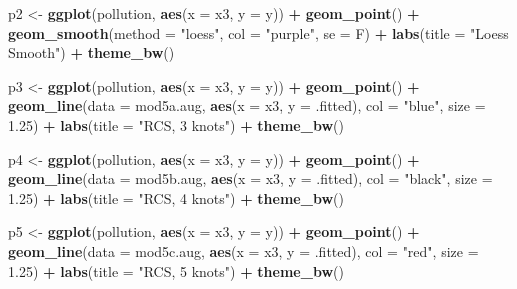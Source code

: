 \documentclass[]{book}
\newenvironment{Shaded}{\begin{snugshade}}{\end{snugshade}}
\newcommand{\KeywordTok}[1]{\textcolor[rgb]{0.13,0.29,0.53}{\textbf{#1}}}
\newcommand{\DataTypeTok}[1]{\textcolor[rgb]{0.13,0.29,0.53}{#1}}
\newcommand{\FloatTok}[1]{\textcolor[rgb]{0.00,0.00,0.81}{#1}}
\newcommand{\StringTok}[1]{\textcolor[rgb]{0.31,0.60,0.02}{#1}}
\newcommand{\OperatorTok}[1]{\textcolor[rgb]{0.81,0.36,0.00}{\textbf{#1}}}
\newcommand{\NormalTok}[1]{#1}
\theoremstyle{definition}
\theoremstyle{definition}
\theoremstyle{definition}
\theoremstyle{remark}
\begin{document}
\begin{Shaded}
\begin{Highlighting}[]
\NormalTok{p2 <-}\StringTok{ }\KeywordTok{ggplot}\NormalTok{(pollution, }\KeywordTok{aes}\NormalTok{(}\DataTypeTok{x =}\NormalTok{ x3, }\DataTypeTok{y =}\NormalTok{ y)) }\OperatorTok{+}
\StringTok{    }\KeywordTok{geom_point}\NormalTok{() }\OperatorTok{+}
\StringTok{    }\KeywordTok{geom_smooth}\NormalTok{(}\DataTypeTok{method =} \StringTok{"loess"}\NormalTok{, }\DataTypeTok{col =} \StringTok{"purple"}\NormalTok{, }\DataTypeTok{se =}\NormalTok{ F) }\OperatorTok{+}
\StringTok{    }\KeywordTok{labs}\NormalTok{(}\DataTypeTok{title =} \StringTok{"Loess Smooth"}\NormalTok{) }\OperatorTok{+}
\StringTok{    }\KeywordTok{theme_bw}\NormalTok{()}

\NormalTok{p3 <-}\StringTok{ }\KeywordTok{ggplot}\NormalTok{(pollution, }\KeywordTok{aes}\NormalTok{(}\DataTypeTok{x =}\NormalTok{ x3, }\DataTypeTok{y =}\NormalTok{ y)) }\OperatorTok{+}
\StringTok{    }\KeywordTok{geom_point}\NormalTok{() }\OperatorTok{+}
\StringTok{    }\KeywordTok{geom_line}\NormalTok{(}\DataTypeTok{data =}\NormalTok{ mod5a.aug, }\KeywordTok{aes}\NormalTok{(}\DataTypeTok{x =}\NormalTok{ x3, }\DataTypeTok{y =}\NormalTok{ .fitted), }
              \DataTypeTok{col =} \StringTok{"blue"}\NormalTok{, }\DataTypeTok{size =} \FloatTok{1.25}\NormalTok{) }\OperatorTok{+}
\StringTok{    }\KeywordTok{labs}\NormalTok{(}\DataTypeTok{title =} \StringTok{"RCS, 3 knots"}\NormalTok{) }\OperatorTok{+}
\StringTok{    }\KeywordTok{theme_bw}\NormalTok{()}

\NormalTok{p4 <-}\StringTok{ }\KeywordTok{ggplot}\NormalTok{(pollution, }\KeywordTok{aes}\NormalTok{(}\DataTypeTok{x =}\NormalTok{ x3, }\DataTypeTok{y =}\NormalTok{ y)) }\OperatorTok{+}
\StringTok{    }\KeywordTok{geom_point}\NormalTok{() }\OperatorTok{+}
\StringTok{    }\KeywordTok{geom_line}\NormalTok{(}\DataTypeTok{data =}\NormalTok{ mod5b.aug, }\KeywordTok{aes}\NormalTok{(}\DataTypeTok{x =}\NormalTok{ x3, }\DataTypeTok{y =}\NormalTok{ .fitted), }
              \DataTypeTok{col =} \StringTok{"black"}\NormalTok{, }\DataTypeTok{size =} \FloatTok{1.25}\NormalTok{) }\OperatorTok{+}
\StringTok{    }\KeywordTok{labs}\NormalTok{(}\DataTypeTok{title =} \StringTok{"RCS, 4 knots"}\NormalTok{) }\OperatorTok{+}
\StringTok{    }\KeywordTok{theme_bw}\NormalTok{()}

\NormalTok{p5 <-}\StringTok{ }\KeywordTok{ggplot}\NormalTok{(pollution, }\KeywordTok{aes}\NormalTok{(}\DataTypeTok{x =}\NormalTok{ x3, }\DataTypeTok{y =}\NormalTok{ y)) }\OperatorTok{+}
\StringTok{    }\KeywordTok{geom_point}\NormalTok{() }\OperatorTok{+}
\StringTok{    }\KeywordTok{geom_line}\NormalTok{(}\DataTypeTok{data =}\NormalTok{ mod5c.aug, }\KeywordTok{aes}\NormalTok{(}\DataTypeTok{x =}\NormalTok{ x3, }\DataTypeTok{y =}\NormalTok{ .fitted), }
              \DataTypeTok{col =} \StringTok{"red"}\NormalTok{, }\DataTypeTok{size =} \FloatTok{1.25}\NormalTok{) }\OperatorTok{+}
\StringTok{    }\KeywordTok{labs}\NormalTok{(}\DataTypeTok{title =} \StringTok{"RCS, 5 knots"}\NormalTok{) }\OperatorTok{+}
\StringTok{    }\KeywordTok{theme_bw}\NormalTok{()}


\end{Highlighting}
\end{Shaded}
\end{document}
